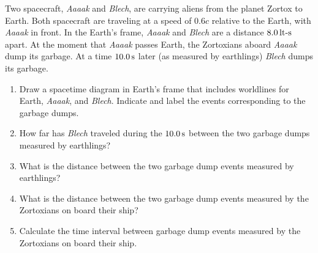 \begin{problem}
Two spacecraft, {\em Aaaak} and {\em Blech}, are carrying aliens from 
the planet Zortox to Earth.  Both spacecraft are traveling
at a speed of $0.6c$ relative to the Earth, with {\em Aaaak} in
front.  In the Earth's frame, {\em Aaaak} and {\em Blech} are
a distance $8.0\,\mbox{lt-s}$ apart. 
At the moment that {\em Aaaak} passes Earth, the Zortoxians aboard {\em Aaaak} 
dump its garbage.  At a time $10.0\,\mbox{s}$ later 
(as measured by earthlings) {\em Blech} dumps its garbage.  
\begin{enumerate}
\item Draw a spacetime diagram in Earth's frame that includes 
worldlines for Earth, {\em Aaaak}, and {\em Blech}.  Indicate and label 
the events corresponding to the garbage dumps.
\item How far has {\em Blech} traveled during the $10.0\,\mbox{s}$ 
between the two garbage dumps measured by earthlings?
\item What is the distance between the two garbage dump events measured by 
earthlings?
\item What is the distance between the two garbage dump events 
measured by the Zortoxians on board their ship?
\item Calculate the time interval between garbage dump events measured by 
the Zortoxians on board their ship.
\end{enumerate}
\label{prob:two_ships}
\end{problem}



